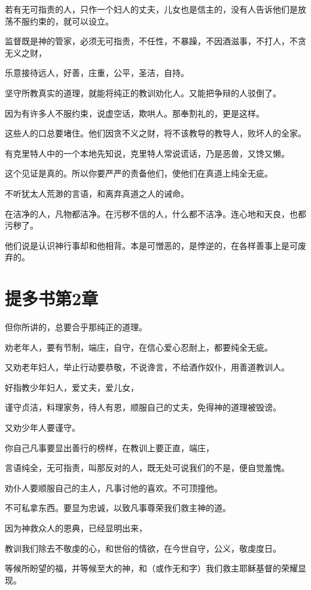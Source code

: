\documentclass[12pt,oneside]{book}
\begin{document}
若有无可指责的人，只作一个妇人的丈夫，儿女也是信主的，没有人告诉他们是放荡不服约束的，就可以设立。

监督既是神的管家，必须无可指责，不任性，不暴躁，不因酒滋事，不打人，不贪无义之财，

乐意接待远人，好善，庄重，公平，圣洁，自持。

坚守所教真实的道理，就能将纯正的教训劝化人。又能把争辩的人驳倒了。

因为有许多人不服约束，说虚空话，欺哄人。那奉割礼的，更是这样。

这些人的口总要堵住。他们因贪不义之财，将不该教导的教导人，败坏人的全家。

有克里特人中的一个本地先知说，克里特人常说谎话，乃是恶兽，又馋又懒。

这个见证是真的。所以你要严严的责备他们，使他们在真道上纯全无疵。

不听犹太人荒渺的言语，和离弃真道之人的诫命。

在洁净的人，凡物都洁净。在污秽不信的人，什么都不洁净。连心地和天良，也都污秽了。

他们说是认识神行事却和他相背。本是可憎恶的，是悖逆的，在各样善事上是可废弃的。

\chapter{提多书第2章}
但你所讲的，总要合乎那纯正的道理。

劝老年人，要有节制，端庄，自守，在信心爱心忍耐上，都要纯全无疵。

又劝老年妇人，举止行动要恭敬，不说谗言，不给酒作奴仆，用善道教训人。

好指教少年妇人，爱丈夫，爱儿女，

谨守贞洁，料理家务，待人有恩，顺服自己的丈夫，免得神的道理被毁谤。

又劝少年人要谨守。

你自己凡事要显出善行的榜样，在教训上要正直，端庄，

言语纯全，无可指责，叫那反对的人，既无处可说我们的不是，便自觉羞愧。

劝仆人要顺服自己的主人，凡事讨他的喜欢。不可顶撞他。

不可私拿东西。要显为忠诚，以致凡事尊荣我们救主神的道。

因为神救众人的恩典，已经显明出来，

教训我们除去不敬虔的心，和世俗的情欲，在今世自守，公义，敬虔度日。

等候所盼望的福，并等候至大的神，和（或作无和字）我们救主耶稣基督的荣耀显现。
\end{document}
